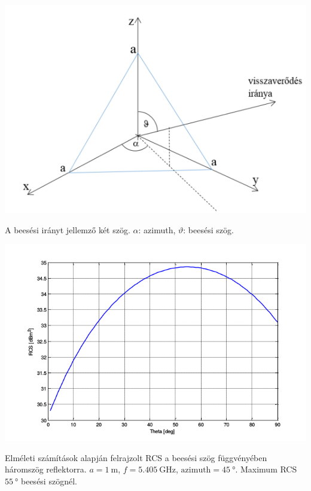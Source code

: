 \documentclass[aspectratio=169]{beamer}
\begin{document}
\begin{frame}
    \begin{minipage}[t]{0.475\textwidth}
        \centering
        \includegraphics[width=\textwidth]{reflector_angles.png}
        
        A beesési irányt jellemző két szög. $\alpha$: azimuth, $\vartheta$: beesési szög.
    \end{minipage}
    \begin{minipage}[t]{0.475\textwidth}
        \centering
        \includegraphics[width=\textwidth]{trihedral_theo.png}
        
        Elméleti számítások alapján felrajzolt RCS a beesési szög függvényében háromszög reflektorra. $a = \SI{1}{\meter} $, $f = \SI{5.405}{\giga\hertz}$, $\text{azimuth} = \SI{45}{\degree}$. Maximum RCS $\SI{55}{\degree}$ beesési szögnél.
    \end{minipage}
\end{frame}
\end{document}
